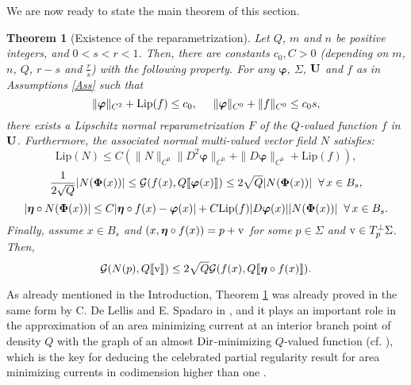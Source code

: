 \documentclass[a4paper,11pt,reqno]{amsart}
\newtheorem{theorem}{Theorem}[section]
\theoremstyle{definition}
\numberwithin{equation}{section}
\numberwithin{subsection}{section}
\newcommand{\G}{\mathcal{G}}
\newcommand{\Lip}{\mathrm{Lip}}
\newcommand{\bphi}{\boldsymbol{\varphi}}
\newcommand{\bfeta}{\boldsymbol{\eta}}
\begin{document}
We are now ready to state the main theorem of this section.

\begin{samepage}
\begin{theorem}[Existence of the reparametrization] \label{reparametrization:thm}
Let $Q$, $m$ and $n$ be positive integers, and $0 < s < r < 1$. Then, there are constants $c_{0}, C > 0$ (depending on $m$, $n$, $Q$, $r - s$ and $\frac{r}{s}$) with the following property. For any $\bphi$, $\Sigma$, ${\bf U}$ and $f$ as in Assumptions \ref{Ass} such that
\begin{equation} \label{reparametrization:hp}
\| \bphi \|_{C^{2}} + \Lip(f) \leq c_{0}, \hspace{0.5cm} \| \bphi \|_{C^{0}} + \| f \|_{C^{0}} \leq c_{0} s,
\end{equation}
there exists a Lipschitz normal reparametrization $F$ of the $Q$-valued function $f$ in ${\bf U}$. Furthermore, the associated normal multi-valued vector field $N$ satisfies:
\begin{equation} \label{reparametrization:th1}
\Lip(N) \leq C \left( \| N \|_{C^0} \| D^{2}\bphi \|_{C^0} + \| D\bphi \|_{C^0} + \Lip(f) \right),
\end{equation}
\begin{equation} \label{reparametrization:th2}
\frac{1}{2\sqrt{Q}} |N({\bf \Phi}(x))| \leq \G(f(x), Q \llbracket \bphi(x) \rrbracket) \leq 2 \sqrt{Q} |N({\bf \Phi}(x))| \hspace{0.2cm} \forall \, x \in B_{s},
\end{equation}
\begin{equation} \label{reparametrization:th3}
|\bfeta \circ N({\bf \Phi}(x))| \leq C |\bfeta \circ f (x) - \bphi(x)| + C \Lip(f) |D\bphi(x)| |N({\bf \Phi}(x))| \hspace{0.2cm} \forall \, x \in B_s.
\end{equation}
Finally, assume $x \in B_s$ and $\left( x, \bfeta \circ f(x) \right) = p + {\rm v}$ for some $p \in \Sigma$ and ${\rm v} \in T_{p}^{\perp}\Sigma$. Then,
\begin{equation} \label{reparametrization:th4}
\G(N(p), Q \llbracket {\rm v} \rrbracket) \leq 2 \sqrt{Q} \G(f(x), Q \llbracket \bfeta \circ f(x) \rrbracket).
\end{equation}
\end{theorem}
\end{samepage}

As already mentioned in the Introduction, Theorem \ref{reparametrization:thm} was already proved in the same form by C. De Lellis and E. Spadaro in \cite[Theorem 5.1]{DLS13a}, and it plays an important role in the approximation of an area minimizing current at an interior branch point of density $Q$ with the graph of an almost ${\rm Dir}$-minimizing $Q$-valued function (cf. \cite[Theorem 2.4]{DLS13b}), which is the key for deducing the celebrated partial regularity result for area minimizing currents in codimension higher than one \cite[Theorem 0.3]{DLS13c}.
\end{document}
